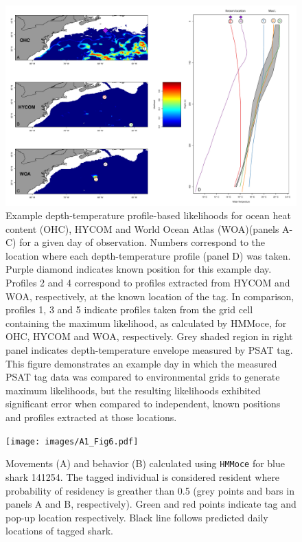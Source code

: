 \clearpage
\begin{landscape}
\begin{figure}[p]
\centering
\includegraphics[width=8in]{images/A1_Fig5.pdf}
\caption{Example depth-temperature profile-based
likelihoods for ocean heat content (OHC), HYCOM and World Ocean Atlas
(WOA)(panels A-C) for a given day of observation. Numbers correspond to
the location where each depth-temperature profile (panel D) was taken.
Purple diamond indicates known position for this example day. Profiles 2
and 4 correspond to profiles extracted from HYCOM and WOA, respectively,
at the known location of the tag. In comparison, profiles 1, 3 and 5
indicate profiles taken from the grid cell containing the maximum
likelihood, as calculated by HMMoce, for OHC, HYCOM and WOA,
respectively. Grey shaded region in right panel indicates
depth-temperature envelope measured by PSAT tag. This figure
demonstrates an example day in which the measured PSAT tag data was
compared to environmental grids to generate maximum likelihoods, but the
resulting likelihoods exhibited significant error when compared to
independent, known positions and profiles extracted at those locations.}
\label{fig:a1f5}
\end{figure}
\end{landscape}
\clearpage

\begin{figure}[p]
\centering
\texttt{[image: images/A1\_Fig6.pdf]}
\caption{Movements (A) and behavior (B) calculated
using \texttt{HMMoce} for blue shark 141254. The tagged individual is
considered resident where probability of residency is greather than 0.5
(grey points and bars in panels A and B, respectively). Green and red
points indicate tag and pop-up location respectively. Black line follows
predicted daily locations of tagged shark.}
\label{fig:a1f6}
\end{figure}

